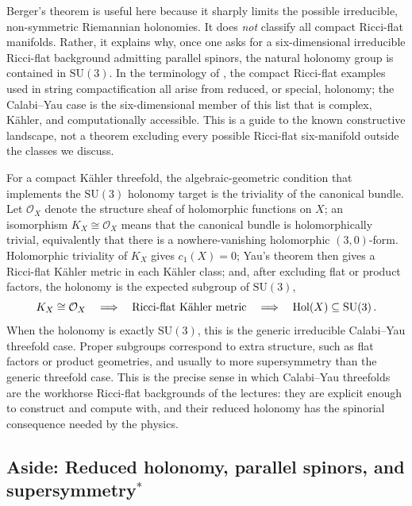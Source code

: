 Berger's theorem is useful here because it sharply limits the
possible irreducible, non-symmetric Riemannian holonomies. It does
\emph{not} classify all compact Ricci-flat manifolds. Rather, it
explains why, once one asks for a six-dimensional irreducible
Ricci-flat background admitting parallel spinors, the natural
holonomy group is contained in $\mathrm{SU}(3)$. In the terminology
of \cite{McAllister:2025qwq}, the compact Ricci-flat
examples used in string compactification all arise from reduced, or
special, holonomy; the Calabi--Yau case is the six-dimensional
member of this list that is complex, K\"ahler, and computationally
accessible. This is a guide to the known constructive landscape, not
a theorem excluding every possible Ricci-flat six-manifold outside
the classes we discuss. 



For a compact K\"ahler threefold, the algebraic-geometric condition
that implements the $\mathrm{SU}(3)$ holonomy target is the
triviality of the canonical bundle.
Let $\mathcal{O}_X$ denote the structure sheaf of holomorphic
functions on $X$; an isomorphism $K_X\cong\mathcal{O}_X$ means that
the canonical bundle is holomorphically trivial, equivalently that
there is a nowhere-vanishing holomorphic $(3,0)$-form.
Holomorphic triviality of $K_X$ gives $c_1(X)=0$;
Yau's theorem then gives a Ricci-flat K\"ahler metric in each
K\"ahler class; and, after excluding flat or product factors, the
holonomy is the expected subgroup of $\mathrm{SU}(3)$,
\begin{equation}
    K_X \cong \mathcal{O}_X
    \quad\Longrightarrow\quad
    \text{Ricci-flat K\"ahler metric}
    \quad\Longrightarrow\quad
    \mathrm{Hol}(X)\subseteq \mathrm{SU}(3)\, .
\end{equation}
When the holonomy is exactly $\mathrm{SU}(3)$, this is the generic
irreducible Calabi--Yau threefold case. Proper subgroups correspond
to extra structure, such as flat factors or product geometries, and
usually to more supersymmetry than the generic threefold case. This
is the precise sense in which Calabi--Yau threefolds are the
workhorse Ricci-flat backgrounds of the lectures: they are explicit
enough to construct and compute with, and their reduced holonomy has
the spinorial consequence needed by the physics.

\subsection{Aside: Reduced holonomy, parallel spinors, and supersymmetry\texorpdfstring{$^{\ast}$}{*}}
\label{ssec:L1-ricci-flat}


